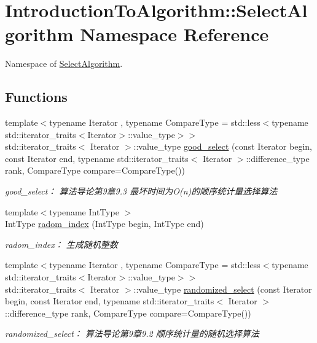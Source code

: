 \hypertarget{namespace_introduction_to_algorithm_1_1_select_algorithm}{}\section{Introduction\+To\+Algorithm\+:\+:Select\+Algorithm Namespace Reference}
\label{namespace_introduction_to_algorithm_1_1_select_algorithm}


Namespace of \hyperlink{namespace_introduction_to_algorithm_1_1_select_algorithm}{Select\+Algorithm}.  


\subsection*{Functions}
\begin{DoxyCompactItemize}
\item 
{\footnotesize template$<$typename Iterator , typename Compare\+Type  = std\+::less$<$typename std\+::iterator\+\_\+traits$<$\+Iterator$>$\+::value\+\_\+type$>$$>$ }\\std\+::iterator\+\_\+traits$<$ Iterator $>$\+::value\+\_\+type \hyperlink{namespace_introduction_to_algorithm_1_1_select_algorithm_af7d1f100ddee11d1de6bde2cd86d8be3}{good\+\_\+select} (const Iterator begin, const Iterator end, typename std\+::iterator\+\_\+traits$<$ Iterator $>$\+::difference\+\_\+type rank, Compare\+Type compare=Compare\+Type())
\begin{DoxyCompactList}\small\item\em good\+\_\+select： 算法导论第9章9.3 最坏时间为\+O(n)的顺序统计量选择算法 \end{DoxyCompactList}\item 
{\footnotesize template$<$typename Int\+Type $>$ }\\Int\+Type \hyperlink{namespace_introduction_to_algorithm_1_1_select_algorithm_a117ee8d5d70d91c5be1d412f9fbad1cd}{radom\+\_\+index} (Int\+Type begin, Int\+Type end)
\begin{DoxyCompactList}\small\item\em radom\+\_\+index： 生成随机整数 \end{DoxyCompactList}\item 
{\footnotesize template$<$typename Iterator , typename Compare\+Type  = std\+::less$<$typename std\+::iterator\+\_\+traits$<$\+Iterator$>$\+::value\+\_\+type$>$$>$ }\\std\+::iterator\+\_\+traits$<$ Iterator $>$\+::value\+\_\+type \hyperlink{namespace_introduction_to_algorithm_1_1_select_algorithm_ae742d2848ba12d8cc796668091e469aa}{randomized\+\_\+select} (const Iterator begin, const Iterator end, typename std\+::iterator\+\_\+traits$<$ Iterator $>$\+::difference\+\_\+type rank, Compare\+Type compare=Compare\+Type())
\begin{DoxyCompactList}\small\item\em randomized\+\_\+select： 算法导论第9章9.2 顺序统计量的随机选择算法 \end{DoxyCompactList}\end{DoxyCompactItemize}


